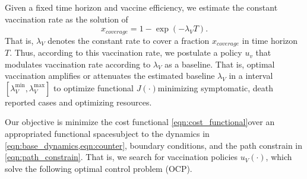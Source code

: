     Given a fixed time horizon and vaccine efficiency,
we estimate the constant vaccination rate as the solution of
\begin{equation}
    x_{coverage} = 1 - \exp(-\lambda_V T).
\end{equation}
    That is, $\lambda_V$ denotes the constant rate
to cover  a fraction $x_{coverage}$ in time horizon $T$.
Thus, according to this vaccination rate, we postulate a policy $u_v$ that
modulates vaccination rate according to $\lambda_V$ as a baseline. That is,
optimal vaccination amplifies or attenuates the estimated baseline
$\lambda_V$ in a interval $[\lambda_V ^ {\min}, \lambda_V ^ {\max}]$
to optimize functional $J(\cdot)$\textemdash minimizing
symptomatic, death reported cases and optimizing resources.

    Our objective is minimize the cost functional
\eqref{eqn:cost_functional}\textemdash over an appropriated functional
space\textemdash subject to the dynamics in
\cref{eqn:base_dynamics,eqn:counter}, boundary conditions, and the path
constrain in \eqref{eqn:path_constrain}.
That is, we search for vaccination policies $u_V(\cdot)$, which
solve the following optimal control problem (OCP).
